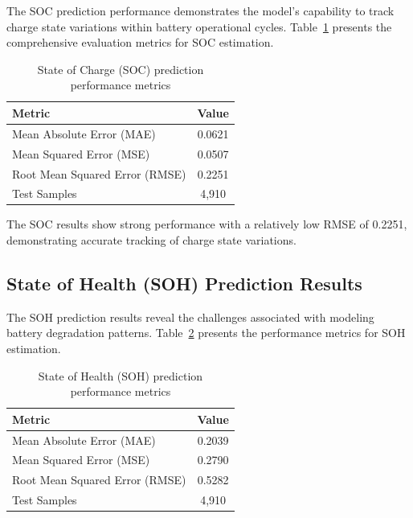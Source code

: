 The SOC prediction performance demonstrates the model's capability to track charge state variations within battery operational cycles. Table~\ref{tab:soc_results} presents the comprehensive evaluation metrics for SOC estimation.

\begin{table}[htbp]
\centering
\caption{State of Charge (SOC) prediction performance metrics}
\label{tab:soc_results}
\begin{tabular}{lc}
\hline
\textbf{Metric} & \textbf{Value} \\
\hline
Mean Absolute Error (MAE) & 0.0621 \\
Mean Squared Error (MSE) & 0.0507 \\
Root Mean Squared Error (RMSE) & 0.2251 \\
Test Samples & 4,910 \\
\hline
\end{tabular}
\end{table}

The SOC results show strong performance with a relatively low RMSE of 0.2251, demonstrating accurate tracking of charge state variations.


\subsection{State of Health (SOH) Prediction Results}
\label{subsec:soh_results}

The SOH prediction results reveal the challenges associated with modeling battery degradation patterns. Table~\ref{tab:soh_results} presents the performance metrics for SOH estimation.

\begin{table}[htbp]
\centering
\caption{State of Health (SOH) prediction performance metrics}
\label{tab:soh_results}
\begin{tabular}{lc}
\hline
\textbf{Metric} & \textbf{Value} \\
\hline
Mean Absolute Error (MAE) & 0.2039 \\
Mean Squared Error (MSE) & 0.2790 \\
Root Mean Squared Error (RMSE) & 0.5282 \\
Test Samples & 4,910 \\
\hline
\end{tabular}
\end{table}

